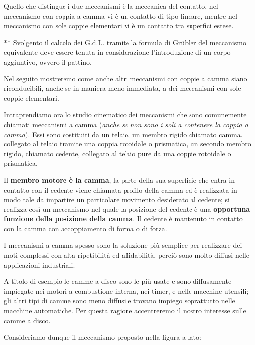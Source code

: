 		Quello che distingue i due meccanismi è la meccanica del contatto, nel meccanismo con coppia a camma vi è un contatto di tipo lineare, mentre nel meccanismo con sole coppie elementari vi è un contatto tra superfici estese.
		
		** Svolgento il calcolo dei G.d.L. tramite la formula di Grübler del meccanismo equivalente deve essere tenuta in considerazione l'introduzione di un corpo aggiuntivo, ovvero il pattino.
		
		Nel seguito mostreremo come anche altri meccanismi con coppie a camma siano riconducibili, anche se in maniera meno immediata, a dei meccanismi con sole coppie elementari. 
		
		Intraprendiamo ora lo studio cinematico dei meccanismi che sono comunemente chiamati meccanismi a camma (\emph{anche se non sono i soli a contenere la coppia a camma}). Essi sono costituiti da un telaio, un membro rigido chiamato camma, collegato al telaio tramite una coppia rotoidale o prismatica, un secondo membro rigido, chiamato cedente, collegato al telaio pure da una coppie rotoidale o prismatica.
		
		Il \textbf{membro motore è la camma}, la parte della sua superficie che entra in contatto con il cedente viene chiamata profilo della camma ed è realizzata in modo tale da impartire un particolare movimento desiderato al cedente; si realizza così un meccanismo nel quale la posizione del cedente è una \textbf{opportuna funzione della posizione della camma}. Il cedente è mantenuto in contatto con la camma con accoppiamento di forma o di forza.
		
		I meccanismi a camma spesso sono la soluzione più semplice per realizzare dei moti complessi con alta ripetibilità ed affidabilità, perciò sono molto diffusi nelle applicazioni industriali. 
		
		A titolo di esempio le camme a disco sono le più usate e sono diffusamente impiegate nei motori a combustione interna, nei timer, e nelle macchine utensili; gli altri tipi di camme sono meno diffusi e trovano impiego soprattutto nelle macchine automatiche. Per questa ragione accentreremo il nostro interesse sulle camme a disco.\newline
			
		Consideriamo dunque il meccanismo proposto nella figura a lato:
				\vspace{2mm}
		

